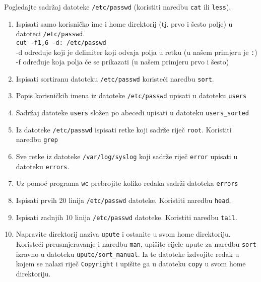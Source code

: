 
\begin{zadatak} Pogledajte sadržaj datoteke \texttt{/etc/passwd} (koristiti naredbu \texttt{cat} ili \texttt{less}).


\begin{enumerate}

\item Ispisati samo korisničko ime i home direktorij (tj. prvo i šesto polje) u datoteci \texttt{/etc/passwd}.\\
 \lstinline!cut -f1,6 -d: /etc/passwd!\\
-d određuje koji je delimiter koji odvaja polja u retku (u našem primjeru je \lstinline!:!)\\
-f određuje koja polja će se prikazati (u našem primjeru prvo i šesto)

\item Ispisati sortiranu datoteku \texttt{/etc/passwd} koristeći naredbu \texttt{sort}.
\item Popis korisničkih imena iz datoteke \texttt{/etc/passwd} upisati u datoteku \texttt{users}
\item Sadržaj datoteke \texttt{users} složen po abecedi upisati u datoteku \texttt{users\_sorted}
\item Iz datoteke \texttt{/etc/passwd} ispisati retke koji sadrže riječ \texttt{root}. Koristiti naredbu \texttt{grep}
\item Sve retke iz datoteke \texttt{/var/log/syslog} koji sadrže riječ \texttt{error} upisati u datoteku \texttt{errors}.
\item Uz pomoć programa \texttt{wc} prebrojite koliko redaka sadrži datoteka \texttt{errors}
\item Ispisati prvih 20 linija \texttt{/etc/passwd} datoteke. Koristiti naredbu \texttt{head}.
\item Ispisati zadnjih 10 linija \texttt{/etc/passwd} datoteke. Koristiti naredbu \texttt{tail}.
\item Napravite direktorij naziva \texttt{upute} i ostanite u svom home direktoriju. Koristeći preusmjeravanje i naredbu \texttt{man}, upišite cijele upute za naredbu \texttt{sort} izravno u datoteku \texttt{upute/sort\_manual}. Iz te datoteke izdvojite redak u kojem se nalazi riječ \texttt{Copyright} i upišite ga u datoteku \texttt{copy} u svom home direktoriju.



\end{enumerate}
\end{zadatak}

